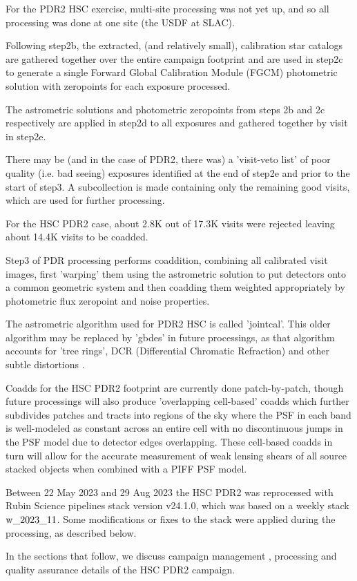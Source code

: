 For the PDR2 HSC exercise, multi-site processing was not yet up, 
and so all processing was done at one site (the USDF at SLAC).

Following step2b, the extracted, (and relatively small),
calibration star catalogs are gathered together over the entire campaign
footprint and are used in step2c to generate a single Forward 
Global Calibration Module (FGCM) photometric solution with zeropoints for
each exposure processed.

The astrometric solutions and photometric zeropoints from steps 2b and 2c
respectively are applied in step2d to all exposures and gathered together 
by visit in step2e.

There may be (and in the case of PDR2, there was) a 'visit-veto list' of 
poor quality (i.e. bad seeing) exposures identified at the end of step2e and 
prior to the start of step3.  A subcollection is made containing only 
the remaining good visits, which are used for further processing.  

For the HSC PDR2 case, about 2.8K out of 17.3K visits were rejected 
leaving about 14.4K visits to be coadded.

Step3 of PDR processing performs coaddition, combining all calibrated 
visit images, first 'warping' them using the astrometric solution to put 
detectors onto a common geometric system and then coadding them weighted 
appropriately by photometric flux zeropoint and noise properties.

The astrometric algorithm used for PDR2 HSC is called 'jointcal'.  This
older algorithm may be replaced by 'gbdes' in future processings, as that
algorithm accounts for 'tree rings', DCR (Differential Chromatic 
Refraction) and other subtle distortions .

Coadds for the HSC PDR2 footprint are currently done patch-by-patch,
though future processings will also produce 'overlapping cell-based' 
coadds  which further subdivides patches and 
tracts into regions of the sky where the PSF in each band 
is well-modeled as constant across an entire cell with no 
discontinuous jumps in the PSF model due to detector edges overlapping.
These cell-based coadds in turn will allow for the accurate measurement of 
weak lensing shears of all source stacked objects when combined with
a PIFF PSF model.

Between 22 May 2023 and 29 Aug 2023 the HSC PDR2 was reprocessed with 
Rubin Science pipelines stack version v24.1.0, which was 
based on a weekly stack $\rm w\_2023\_11$.  Some modifications or fixes 
to the stack were applied during the processing, as described below.

In the sections that follow, we discuss campaign 
management , 
processing  and quality 
assurance  details of the HSC PDR2 campaign.


